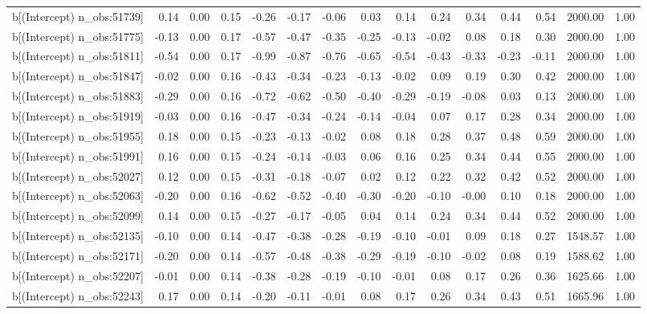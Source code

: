 \begin{table}[ht]
\begin{tabular}{rrrrrrrrrrrrrrr}
  b[(Intercept) n\_obs:51739] & 0.14 & 0.00 & 0.15 & -0.26 & -0.17 & -0.06 & 0.03 & 0.14 & 0.24 & 0.34 & 0.44 & 0.54 & 2000.00 & 1.00 \\ 
  b[(Intercept) n\_obs:51775] & -0.13 & 0.00 & 0.17 & -0.57 & -0.47 & -0.35 & -0.25 & -0.13 & -0.02 & 0.08 & 0.18 & 0.30 & 2000.00 & 1.00 \\ 
  b[(Intercept) n\_obs:51811] & -0.54 & 0.00 & 0.17 & -0.99 & -0.87 & -0.76 & -0.65 & -0.54 & -0.43 & -0.33 & -0.23 & -0.11 & 2000.00 & 1.00 \\ 
  b[(Intercept) n\_obs:51847] & -0.02 & 0.00 & 0.16 & -0.43 & -0.34 & -0.23 & -0.13 & -0.02 & 0.09 & 0.19 & 0.30 & 0.42 & 2000.00 & 1.00 \\ 
  b[(Intercept) n\_obs:51883] & -0.29 & 0.00 & 0.16 & -0.72 & -0.62 & -0.50 & -0.40 & -0.29 & -0.19 & -0.08 & 0.03 & 0.13 & 2000.00 & 1.00 \\ 
  b[(Intercept) n\_obs:51919] & -0.03 & 0.00 & 0.16 & -0.47 & -0.34 & -0.24 & -0.14 & -0.04 & 0.07 & 0.17 & 0.28 & 0.34 & 2000.00 & 1.00 \\ 
  b[(Intercept) n\_obs:51955] & 0.18 & 0.00 & 0.15 & -0.23 & -0.13 & -0.02 & 0.08 & 0.18 & 0.28 & 0.37 & 0.48 & 0.59 & 2000.00 & 1.00 \\ 
  b[(Intercept) n\_obs:51991] & 0.16 & 0.00 & 0.15 & -0.24 & -0.14 & -0.03 & 0.06 & 0.16 & 0.25 & 0.34 & 0.44 & 0.55 & 2000.00 & 1.00 \\ 
  b[(Intercept) n\_obs:52027] & 0.12 & 0.00 & 0.15 & -0.31 & -0.18 & -0.07 & 0.02 & 0.12 & 0.22 & 0.32 & 0.42 & 0.52 & 2000.00 & 1.00 \\ 
  b[(Intercept) n\_obs:52063] & -0.20 & 0.00 & 0.16 & -0.62 & -0.52 & -0.40 & -0.30 & -0.20 & -0.10 & -0.00 & 0.10 & 0.18 & 2000.00 & 1.00 \\ 
  b[(Intercept) n\_obs:52099] & 0.14 & 0.00 & 0.15 & -0.27 & -0.17 & -0.05 & 0.04 & 0.14 & 0.24 & 0.34 & 0.44 & 0.52 & 2000.00 & 1.00 \\ 
  b[(Intercept) n\_obs:52135] & -0.10 & 0.00 & 0.14 & -0.47 & -0.38 & -0.28 & -0.19 & -0.10 & -0.01 & 0.09 & 0.18 & 0.27 & 1548.57 & 1.00 \\ 
  b[(Intercept) n\_obs:52171] & -0.20 & 0.00 & 0.14 & -0.57 & -0.48 & -0.38 & -0.29 & -0.19 & -0.10 & -0.02 & 0.08 & 0.19 & 1588.62 & 1.00 \\ 
  b[(Intercept) n\_obs:52207] & -0.01 & 0.00 & 0.14 & -0.38 & -0.28 & -0.19 & -0.10 & -0.01 & 0.08 & 0.17 & 0.26 & 0.36 & 1625.66 & 1.00 \\ 
  b[(Intercept) n\_obs:52243] & 0.17 & 0.00 & 0.14 & -0.20 & -0.11 & -0.01 & 0.08 & 0.17 & 0.26 & 0.34 & 0.43 & 0.51 & 1665.96 & 1.00 \\ 

\end{tabular}
\end{table}
